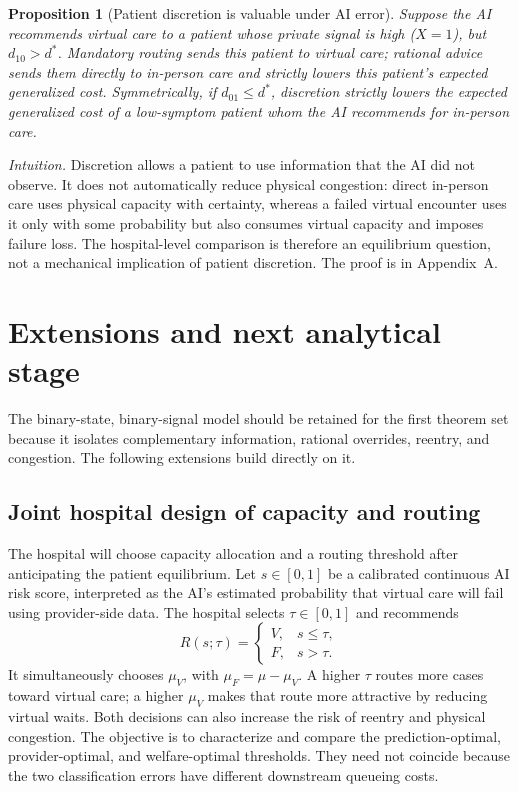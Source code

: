 \documentclass[11pt]{article}
\newtheorem{proposition}{Proposition}
\begin{document}
\begin{proposition}[Patient discretion is valuable under AI error]
Suppose the AI recommends virtual care to a patient whose private signal is high ($X=1$), but $d_{10}>d^*$.  Mandatory routing sends this patient to virtual care; rational advice sends them directly to in-person care and strictly lowers this patient's expected generalized cost.  Symmetrically, if $d_{01}\leq d^*$, discretion strictly lowers the expected generalized cost of a low-symptom patient whom the AI recommends for in-person care.
\end{proposition}

\noindent\emph{Intuition.}  Discretion allows a patient to use information that the AI did not observe.  It does not automatically reduce physical congestion: direct in-person care uses physical capacity with certainty, whereas a failed virtual encounter uses it only with some probability but also consumes virtual capacity and imposes failure loss.  The hospital-level comparison is therefore an equilibrium question, not a mechanical implication of patient discretion.  The proof is in Appendix~A.

\section{Extensions and next analytical stage}

The binary-state, binary-signal model should be retained for the first theorem set because it isolates complementary information, rational overrides, reentry, and congestion.  The following extensions build directly on it.

\subsection{Joint hospital design of capacity and routing}

The hospital will choose capacity allocation and a routing threshold after anticipating the patient equilibrium.  Let $s\in[0,1]$ be a calibrated continuous AI risk score, interpreted as the AI's estimated probability that virtual care will fail using provider-side data.  The hospital selects $\tau\in[0,1]$ and recommends
\[
 R(s;\tau)=
 \begin{cases}
 V,&s\leq\tau,\\
 F,&s>\tau.
 \end{cases}
\]
It simultaneously chooses $\mu_V$, with $\mu_F=\mu-\mu_V$.  A higher $\tau$ routes more cases toward virtual care; a higher $\mu_V$ makes that route more attractive by reducing virtual waits.  Both decisions can also increase the risk of reentry and physical congestion.  The objective is to characterize and compare the prediction-optimal, provider-optimal, and welfare-optimal thresholds.  They need not coincide because the two classification errors have different downstream queueing costs.
\end{document}
